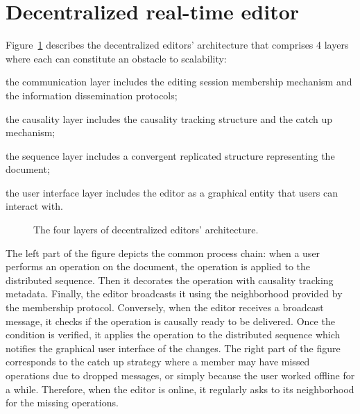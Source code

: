 
\section{Decentralized real-time editor}
\label{sec:editor}




Figure~\ref{fig:architecture} describes the decentralized editors' architecture
that comprises 4 layers where each can constitute an obstacle to scalability:
\begin{inparaenum}[(i)]
\item the communication layer includes the editing session membership mechanism
  and the information dissemination protocols;
\item the causality layer includes the causality tracking structure and the
  catch up mechanism; %
\item the sequence layer includes a convergent replicated structure representing
  the document;
\item the user interface layer includes the editor as a graphical entity that
  users can interact with. %
\end{inparaenum}

\begin{figure}
  \centering
  
  \caption{\label{fig:architecture}The four layers of decentralized editors'
    architecture.}
\end{figure}


The left part of the figure depicts the common process chain: when a user
performs an operation on the document, the operation is applied to the
distributed sequence. Then it decorates the operation with causality tracking
metadata. Finally, the editor broadcasts it using the neighborhood provided by
the membership protocol.  Conversely, when the editor receives a broadcast
message, it checks if the operation is causally ready to be delivered. Once the
condition is verified, it applies the operation to the distributed sequence
which notifies the graphical user interface of the changes.  The right part of
the figure corresponds to the catch up strategy where a member may have missed
operations due to dropped messages, or simply because the user worked offline
for a while. Therefore, when the editor is online, it regularly asks to its
neighborhood for the missing operations.

